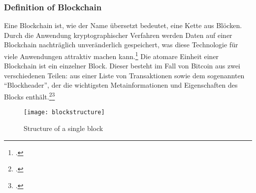\subsubsection{Definition of Blockchain} \label{toc:kryptowaehrungenundblockchain}

Eine Blockchain ist, wie der Name übersetzt bedeutet, eine Kette aus Blöcken. Durch die Anwendung kryptographischer
Verfahren werden Daten auf einer Blockchain nachträglich unveränderlich gespeichert, was diese Technologie für viele
Anwendungen attraktiv machen kann.\footcite[Cf.][p. 1]{friedlmaier2018disrupting} Die atomare Einheit einer Blockchain
ist ein einzelner Block. Dieser besteht im Fall von Bitcoin aus zwei verschiedenen Teilen: aus einer Liste von Transaktionen
sowie dem sogenannten "`Blockheader"', der die wichtigsten Metainformationen und Eigenschaften des Blocks
enthält.\footcite[Cf.][p. 48]{bhaskar2015bitcoin}\footcite[Cf.][p. 4]{nakamoto2008bitcoin}

\begin{figure}[H]
    \caption{Structure of a single block}
    \texttt{[image: blockstructure]}
    \label{figure:blockstructure}
    \\
    \cite[Source: Based on][p. 4]{nakamoto2008bitcoin}
\end{figure}

